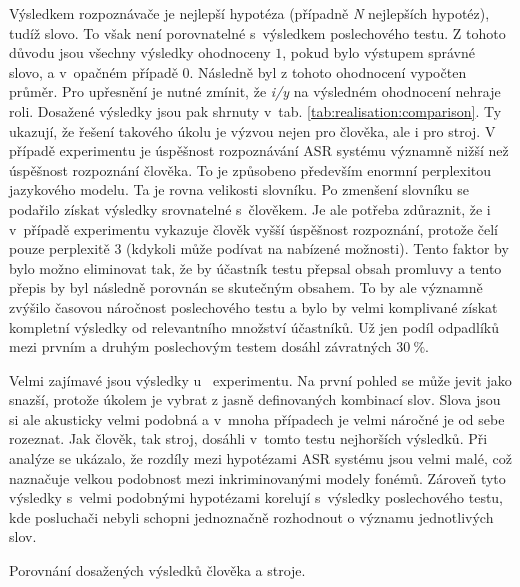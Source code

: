 Výsledkem rozpoznávače je nejlepší hypotéza (případně \textit{N} nejlepších hypotéz), tudíž slovo.
To však není porovnatelné s~výsledkem poslechového testu.
Z tohoto důvodu jsou všechny výsledky ohodnoceny $1$, pokud bylo výstupem správné slovo, a v~opačném případě $0$.
Následně byl z tohoto ohodnocení vypočten průměr.
Pro upřesnění je nutné zmínit, že \textit{i/y} na výsledném ohodnocení nehraje roli.
Dosažené výsledky jsou pak shrnuty v~tab. \ref{tab:realisation:comparison}.
Ty ukazují, že řešení takového úkolu je výzvou nejen pro člověka, ale i pro stroj.
V případě experimentu  je úspěšnost rozpoznávání ASR systému významně nižší než úspěšnost rozpoznání člověka.
To je způsobeno především enormní perplexitou jazykového modelu.
Ta je rovna velikosti slovníku.
Po zmenšení slovníku se podařilo získat výsledky srovnatelné s~člověkem.
Je ale potřeba zdůraznit, že i v~případě  experimentu vykazuje člověk vyšší úspěšnost rozpoznání, protože čelí pouze perplexitě $3$ (kdykoli může podívat na nabízené možnosti).
Tento faktor by bylo možno eliminovat tak, že by účastník testu přepsal obsah promluvy a tento přepis by byl následně porovnán se skutečným obsahem.
To by ale významně zvýšilo časovou náročnost poslechového testu a bylo by velmi komplivané získat kompletní výsledky od relevantního množství účastníků.
Už jen podíl odpadlíků mezi prvním a druhým poslechovým testem dosáhl závratných $30~\%$.

Velmi zajímavé jsou výsledky u~ experimentu.
Na první pohled se může jevit jako snazší, protože úkolem je vybrat z jasně definovaných kombinací slov.
Slova jsou si ale akusticky velmi podobná a v~mnoha případech je velmi náročné je od sebe rozeznat.
Jak člověk, tak stroj, dosáhli v~tomto testu nejhorších výsledků.
Při analýze se ukázalo, že rozdíly mezi hypotézami ASR systému jsou velmi malé, což naznačuje velkou podobnost mezi inkriminovanými modely fonémů.
Zároveň tyto výsledky s~velmi podobnými hypotézami korelují s~výsledky poslechového testu, kde posluchači nebyli schopni jednoznačně rozhodnout o významu jednotlivých slov.

\begin{table}[htpb]
  \centering
  \def\arraystretch{1.5}
  \caption{Porovnání dosažených výsledků člověka a stroje.}
  \label{tab:realisation:comparison}
\end{table}

